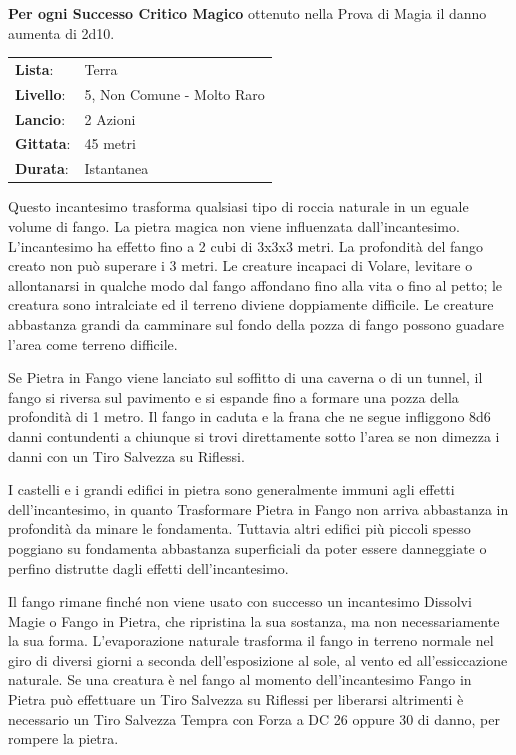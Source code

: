 \begin{multicols}{2}
\textbf{Per ogni Successo Critico Magico} ottenuto nella Prova di Magia il danno aumenta di 2d10.


\noindent\begin{tabularx}{\linewidth}{p{1.3cm}X}
	\rowcolor{gray!20}\textbf{Lista}: & Terra \\
	\textbf{Livello}: & 5, Non Comune - Molto Raro \\
	\rowcolor{gray!20}\textbf{Lancio}: & 2 Azioni \\
	\textbf{Gittata}: & 45 metri \\
	\rowcolor{gray!20}\textbf{Durata}: & Istantanea \\
\end{tabularx}\smallskip


Questo incantesimo trasforma qualsiasi tipo di roccia naturale in un eguale volume di fango. La pietra magica non viene influenzata dall'incantesimo. L'incantesimo ha effetto fino a 2 cubi di 3x3x3 metri. La profondità del fango creato non può superare i 3 metri. Le creature incapaci di Volare, levitare o allontanarsi in qualche modo dal fango affondano fino alla vita o fino al petto; le creatura sono intralciate ed il terreno diviene doppiamente difficile. Le creature abbastanza grandi da camminare sul fondo della pozza di fango possono guadare l'area come terreno difficile.

Se Pietra in Fango viene lanciato sul soffitto di una caverna o di un tunnel, il fango si riversa sul pavimento e si espande fino a formare una pozza della profondità di 1 metro. Il fango in caduta e la frana che ne segue infliggono 8d6 danni contundenti a chiunque si trovi direttamente sotto l'area se non dimezza i danni con un Tiro Salvezza su Riflessi.

I castelli e i grandi edifici in pietra sono generalmente immuni agli effetti dell'incantesimo, in quanto Trasformare Pietra in Fango non arriva abbastanza in profondità da minare le fondamenta. Tuttavia altri edifici più piccoli spesso poggiano su fondamenta abbastanza superficiali da poter essere danneggiate o perfino distrutte dagli effetti dell'incantesimo.

Il fango rimane finché non viene usato con successo un incantesimo Dissolvi Magie o Fango in Pietra, che ripristina la sua sostanza, ma non necessariamente la sua forma. L'evaporazione naturale trasforma il fango in terreno normale nel giro di diversi giorni a seconda dell'esposizione al sole, al vento ed all'essiccazione naturale.
Se una creatura è nel fango al momento dell'incantesimo Fango in Pietra può effettuare un Tiro Salvezza su Riflessi per liberarsi altrimenti è necessario un Tiro Salvezza Tempra con Forza a DC 26 oppure 30 di danno, per rompere la pietra.


\end{multicols}
